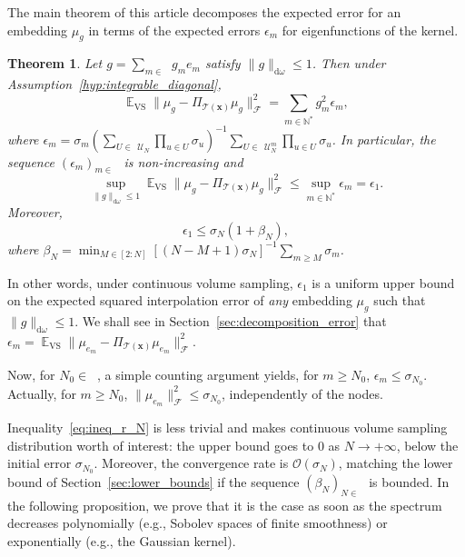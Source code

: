 \documentclass[twoside,11pt]{book}
\newtheorem{theorem}{Theorem}
\DeclareMathOperator{\Span}{\mathrm{Span}}
\DeclareMathOperator{\VS}{\mathrm{VS}}
\DeclareMathOperator{\EX}{\mathbb{E}}
\DeclareMathOperator{\F}{\mathcal{F}}
\DeclareMathOperator{\Ns}{\mathbb{N}^{*}}
\def\UN{\:\mathcal{U}_N}
\def\UNm{\:\mathcal{U}_N^m}
\begin{document}
The main theorem of this article decomposes the expected error for an embedding $\mu_g$ in terms of the expected errors $\epsilon_m$ for eigenfunctions of the kernel.
\begin{theorem}\label{thm:main_result_1}
Let $\displaystyle g = \sum\limits_{m\in \Ns} g_m e_m$ satisfy $\| g\|_{\mathrm{d}\omega} \leq 1$.  Then under Assumption~\ref{hyp:integrable_diagonal},
\begin{equation}\label{eq:main_result_EX_VS_err_mu}
\EX_{\VS} \|\mu_{g} - \Pi_{\mathcal{T}(\bm{x})} \mu_{g}\|_{\F}^{2} = \sum\limits_{m \in \mathbb{N}^{*}} g_{m}^{2} \epsilon_{m},
\end{equation}
where $\epsilon_{m} = \sigma_{m} \left(\sum\limits_{ U \in \: \UN} \prod\limits_{u \in U} \sigma_{u} \right)^{-1}  \sum\limits_{  U \in \: \UNm} \prod\limits_{u \in U} \sigma_{u}$.
In particular, the sequence $(\epsilon_m)_{m \in \Ns}$ is non-increasing and
\begin{equation}\label{eq:upper_bound_sup_epsilon}
\sup_{\| g\|_{\mathrm{d}\omega} \leq 1} \EX_{\VS} \|\mu_{g} - \Pi_{\mathcal{T}(\bm{x})} \mu_{g}\|_{\F}^{2} \leq \sup\limits_{m \in \mathbb{N}^{*}} \epsilon_{m} = \epsilon_1.
\end{equation}
Moreover,
\begin{equation}\label{eq:ineq_r_N}
\epsilon_{1} \leq \sigma_{N} \left(1+ \beta_{N}\right),
\end{equation}
where $\displaystyle \beta_{N} = \min_{M \in [2:N]} \left[(N-M+1)\sigma_N\right]^{-1} \sum_{m \geq M} \sigma_m$.
\end{theorem}

In other words, under continuous volume sampling, $\epsilon_{1}$ is a uniform upper bound on the expected squared interpolation error of \emph{any} embedding $\mu_{g}$ such that $\|g\|_{\mathrm{d}\omega} \leq 1$. We shall see in Section~\ref{sec:decomposition_error} that $\epsilon_m = \EX_{\VS} \|\mu_{e_{m}} - \Pi_{\mathcal{T}(\bm{x})} \mu_{e_{m}}\|_{\F}^{2}$.

Now, for $N_{0} \in \Ns$, a simple counting argument yields, for $m \geq N_{0}$, $\epsilon_{m} \leq \sigma_{N_{0}}$. Actually, for $m \geq N_{0}$, $\|\mu_{e_{m}}\|_{\F}^{2} \leq \sigma_{N_{0}}$, independently of the nodes.


%
Inequality~\eqref{eq:ineq_r_N} is less trivial and makes continuous volume sampling distribution worth of interest: the upper bound goes to $0$ as $N \rightarrow +\infty$, below the initial error $\sigma_{N_0}$.
 Moreover, the convergence rate is $\mathcal{O}(\sigma_{N})$, matching the lower bound of Section~\ref{sec:lower_bounds} if the sequence $(\beta_{N})_{N \in \Ns}$ is bounded. In the following proposition, we prove that it is the case as soon as the spectrum decreases polynomially (e.g., Sobolev spaces of finite smoothness) or exponentially (e.g., the Gaussian kernel).
\end{document}
